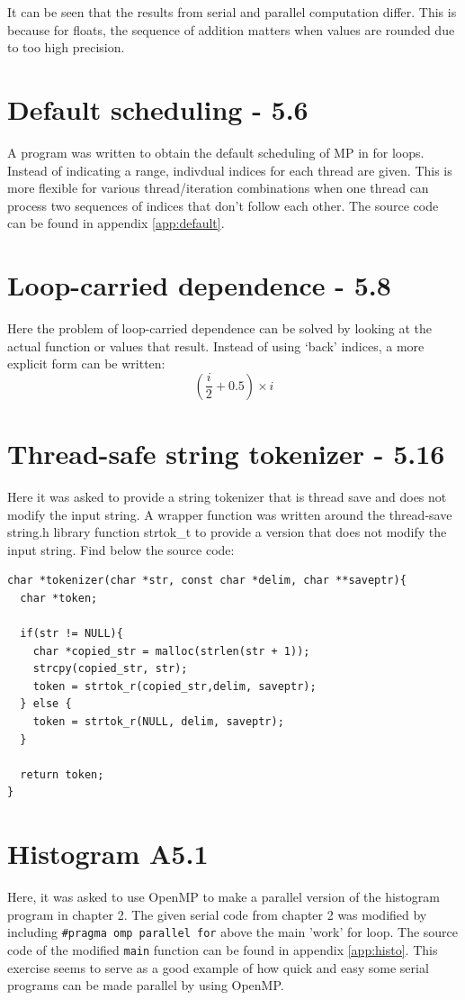 \documentclass[a4paper,11pt,twoside]{article}
\begin{document}
It can be seen that the results from serial and parallel computation differ. This is because for floats, the sequence of addition matters when values are rounded due to too high precision. 

\section{Default scheduling - 5.6}
A program was written to obtain the default scheduling of MP in for loops. Instead of indicating a range, indivdual indices for each thread are given. This is more flexible for various thread/iteration combinations when one thread can process two sequences of indices that don't follow each other. The source code can be found in appendix \ref{app:default}.  

\section{Loop-carried dependence - 5.8}
Here the problem of loop-carried dependence can be solved by looking at the actual function or values that result. Instead of using `back' indices, a more explicit form can be written:
\begin{equation}
(\frac{i}{2} + 0.5)\times i  
\end{equation}

\section{Thread-safe string tokenizer - 5.16}
Here it was asked to provide a string tokenizer that is thread save and does not modify the input string.
A wrapper function was written around the thread-save string.h library function strtok\_t to provide a version that does not modify the input string. Find below the source code:
\begin{verbatim}
char *tokenizer(char *str, const char *delim, char **saveptr){
  char *token;

  if(str != NULL){
    char *copied_str = malloc(strlen(str + 1));
    strcpy(copied_str, str);
    token = strtok_r(copied_str,delim, saveptr);
  } else {
    token = strtok_r(NULL, delim, saveptr); 
  }

  return token; 
}
\end{verbatim}

\section{Histogram A5.1}
Here, it was asked to use OpenMP to make a parallel version of the histogram program in chapter 2. The given serial code from chapter 2 was modified by including \verb+#pragma omp parallel for+ above the main 'work' for loop. The source code of the modified \verb+main+ function can be found in appendix \ref{app:histo}. This exercise seems to serve as a good example of how quick and easy some serial programs can be made parallel by using OpenMP.
\end{document}
